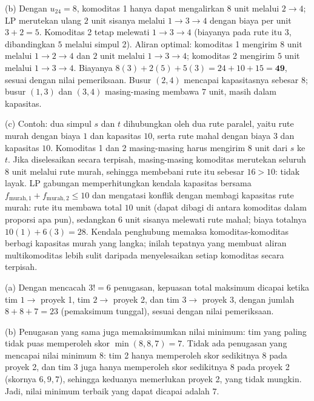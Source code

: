 (b) Dengan $u_{24} = 8$, komoditas 1 hanya dapat mengalirkan $8$ unit melalui $2 \to 4$; LP merutekan ulang $2$ unit sisanya melalui $1 \to 3 \to 4$ dengan biaya per unit $3 + 2 = 5$. Komoditas 2 tetap melewati $1 \to 3 \to 4$ (biayanya pada rute itu $3$, dibandingkan $5$ melalui simpul 2). Aliran optimal: komoditas 1 mengirim $8$ unit melalui $1 \to 2 \to 4$ dan $2$ unit melalui $1 \to 3 \to 4$; komoditas 2 mengirim $5$ unit melalui $1 \to 3 \to 4$. Biayanya $8(3) + 2(5) + 5(3) = 24 + 10 + 15 = \mathbf{49}$, sesuai dengan nilai pemeriksaan. Busur $(2,4)$ mencapai kapasitasnya sebesar $8$; busur $(1,3)$ dan $(3,4)$ masing-masing membawa $7$ unit, masih dalam kapasitas.

(c) Contoh: dua simpul $s$ dan $t$ dihubungkan oleh dua rute paralel, yaitu rute murah dengan biaya $1$ dan kapasitas $10$, serta rute mahal dengan biaya $3$ dan kapasitas $10$. Komoditas 1 dan 2 masing-masing harus mengirim $8$ unit dari $s$ ke $t$. Jika diselesaikan secara terpisah, masing-masing komoditas merutekan seluruh $8$ unit melalui rute murah, sehingga membebani rute itu sebesar $16 > 10$: tidak layak. LP gabungan memperhitungkan kendala kapasitas bersama $f_{\text{murah},1} + f_{\text{murah},2} \leq 10$ dan mengatasi konflik dengan membagi kapasitas rute murah: rute itu membawa total $10$ unit (dapat dibagi di antara komoditas dalam proporsi apa pun), sedangkan $6$ unit sisanya melewati rute mahal; biaya totalnya $10(1) + 6(3) = 28$. Kendala penghubung memaksa komoditas-komoditas berbagi kapasitas murah yang langka; inilah tepatnya yang membuat aliran multikomoditas lebih sulit daripada menyelesaikan setiap komoditas secara terpisah.


(a) Dengan mencacah $3! = 6$ penugasan, kepuasan total maksimum dicapai ketika tim $1 \to$ proyek 1, tim $2 \to$ proyek 2, dan tim $3 \to$ proyek 3, dengan jumlah $8 + 8 + 7 = 23$ (pemaksimum tunggal), sesuai dengan nilai pemeriksaan.

(b) Penugasan yang sama juga memaksimumkan nilai minimum: tim yang paling tidak puas memperoleh skor $\min(8, 8, 7) = 7$. Tidak ada penugasan yang mencapai nilai minimum $8$: tim 2 hanya memperoleh skor sedikitnya $8$ pada proyek 2, dan tim 3 juga hanya memperoleh skor sedikitnya $8$ pada proyek 2 (skornya $6, 9, 7$), sehingga keduanya memerlukan proyek 2, yang tidak mungkin. Jadi, nilai minimum terbaik yang dapat dicapai adalah $7$.

